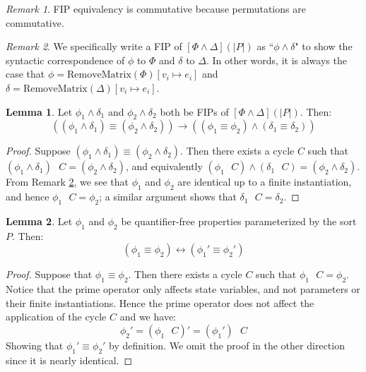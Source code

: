 \documentclass[12pt]{article}
\theoremstyle{definition}
\newtheorem{lemma}{Lemma}
\theoremstyle{remark}
\newtheorem{remark}{Remark}
\newcommand{\msp}{\text{ }}
\begin{document}
\begin{remark}
  \label{rmk:fip-eq-comm}
  FIP equivalency is commutative because permutations are commutative.
\end{remark}

\begin{remark}
  \label{rmk:fip-syntax}
  We specifically write a FIP of $[\Phi\land\Delta](|P|)$ as ``$\phi\land\delta$" to show the syntactic correspondence of $\phi$ to $\Phi$ and $\delta$ to $\Delta$.  In other words, it is always the case that $\phi = \text{RemoveMatrix}(\Phi)[v_i \mapsto e_i]$ and $\delta = \text{RemoveMatrix}(\Delta)[v_i \mapsto e_i]$.
\end{remark}

\begin{lemma}
  \label{lem:and-decomp}
  Let $\phi_1\land\delta_1$ and $\phi_2\land\delta_2$ both be FIPs of $[\Phi\land\Delta](|P|)$.  Then:
  $$((\phi_1\land\delta_1) \equiv (\phi_2\land\delta_2)) \rightarrow ((\phi_1 \equiv \phi_2) \land (\delta_1 \equiv \delta_2))$$
\end{lemma}
\begin{proof}
  Suppose $(\phi_1\land\delta_1) \equiv (\phi_2\land\delta_2)$.  Then there exists a cycle $C$ such that $(\phi_1\land\delta_1) \msp C = (\phi_2\land\delta_2)$, and equivalently $(\phi_1 \msp C) \land (\delta_1 \msp C) = (\phi_2\land\delta_2)$.  From Remark \ref{rmk:fip-syntax}, we see that $\phi_1$ and $\phi_2$ are identical up to a finite instantiation, and hence $\phi_1 \msp C = \phi_2$; a similar argument shows that $\delta_1 \msp C = \delta_2$.
\end{proof}

\begin{lemma}
  \label{lem:prime-bijec}
  Let $\phi_1$ and $\phi_2$ be quantifier-free properties parameterized by the sort $P$.  Then:
  $$(\phi_1 \equiv \phi_2) \leftrightarrow (\phi_1' \equiv \phi_2')$$
\end{lemma}
\begin{proof}
  Suppose that $\phi_1 \equiv \phi_2$.  Then there exists a cycle $C$ such that $\phi_1 \msp C = \phi_2$.  Notice that the prime operator only affects state variables, and not parameters or their finite instantiations.  Hence the prime operator does not affect the application of the cycle $C$ and we have:
  $$\phi_2' = (\phi_1 \msp C)' = (\phi_1') \msp C$$
  Showing that $\phi_1' \equiv \phi_2'$ by definition.  We omit the proof in the other direction since it is nearly identical.
\end{proof}
\end{document}
